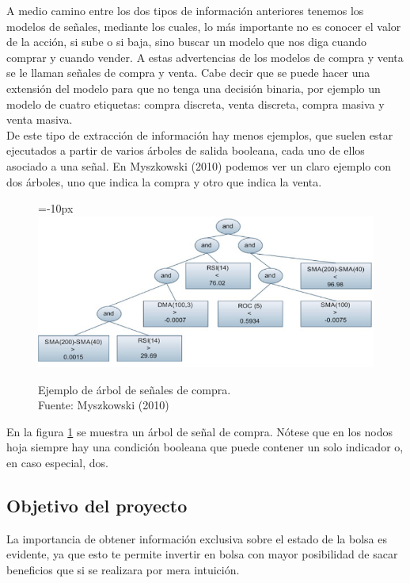      A medio camino entre los dos tipos de informaci\'on anteriores tenemos los modelos de señales, mediante los cuales, lo m\'as importante no es conocer el valor de la acci\'on, si sube o si baja, sino buscar un modelo que nos diga cuando comprar y cuando vender. A estas advertencias de los modelos de compra y venta se le llaman se\~nales de compra y venta. Cabe decir que se puede hacer una extensi\'on del modelo para que no tenga una decisi\'on binaria, por ejemplo un modelo de cuatro etiquetas: compra discreta, venta discreta, compra masiva y venta masiva. \\
     
     De este tipo de extracci\'on de informaci\'on hay menos ejemplos, que suelen estar ejecutados a partir de varios \'arboles de salida booleana, cada uno de ellos asociado a una se\~nal. En Myszkowski (2010) podemos ver un claro ejemplo con dos \'arboles, uno que indica la compra y otro que indica la venta.\\
     
     	\begin{figure}[H]
			\centering\leftskip=-10px
			\includegraphics[scale=0.77]{imagenes/tree_halfinfo.png}
			\caption[Ejemplo de \'arbol de señales de compra]{Ejemplo de \'arbol de señales de compra. \\Fuente: Myszkowski (2010)}
			\label{fig:tree_half_info}
		\end{figure}
		
	En la figura \ref{fig:tree_half_info} se muestra un \'arbol de se\~nal de compra. N\'otese que en los nodos hoja siempre hay una condici\'on booleana que puede contener un solo indicador o, en caso especial, dos.\\
	
	\subsection{Objetivo del proyecto}
	La importancia de obtener informaci\'on exclusiva sobre el estado de la bolsa es evidente, ya que esto te permite invertir en bolsa con mayor posibilidad de sacar beneficios que si se realizara por mera intuici\'on.\\
	
